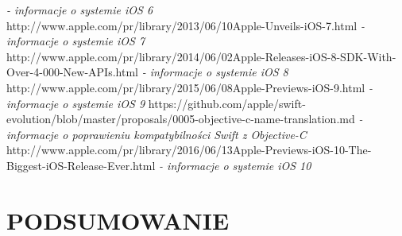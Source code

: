 \documentclass[11pt,twoside,a4paper]{report}
\begin{document}
\begin{thebibliography}{50}
\emph{ - informacje o systemie iOS 6}
http://www.apple.com/pr/library/2013/06/10Apple-Unveils-iOS-7.html
\emph{ - informacje o systemie iOS 7}
http://www.apple.com/pr/library/2014/06/02Apple-Releases-iOS-8-SDK-With-Over-4-000-New-APIs.html
\emph{ - informacje o systemie iOS 8}
http://www.apple.com/pr/library/2015/06/08Apple-Previews-iOS-9.html
\emph{ - informacje o systemie iOS 9}
https://github.com/apple/swift-evolution/blob/master/proposals/0005-objective-c-name-translation.md
\emph{ - informacje o poprawieniu kompatybilności Swift z Objective-C}
http://www.apple.com/pr/library/2016/06/13Apple-Previews-iOS-10-The-Biggest-iOS-Release-Ever.html
\emph{ - informacje o systemie iOS 10}
\end{thebibliography}
\chapter{PODSUMOWANIE}
\end{document}
